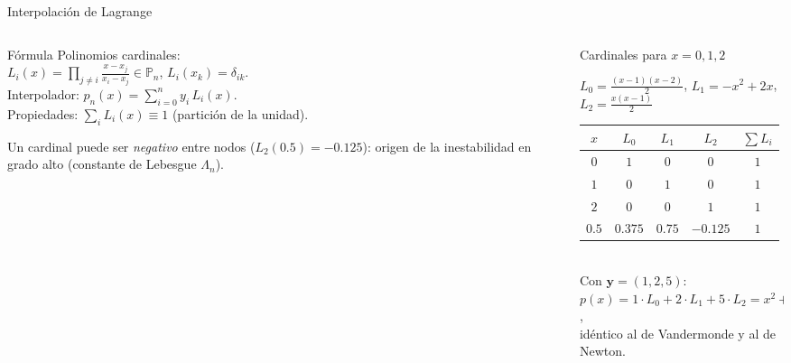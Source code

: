 \documentclass[aspectratio=169,10pt]{beamer}
\begin{document}
\begin{frame}{Interpolación de Lagrange}
\begin{columns}[T]
\begin{column}{0.44\textwidth}
\begin{cardidea}{Fórmula}{\faSuperscript}
{\footnotesize Polinomios cardinales:\\[0.2mm]
$L_i(x)=\displaystyle\prod_{j\neq i}\frac{x-x_j}{x_i-x_j}\in\mathbb P_n$, \; $L_i(x_k)=\delta_{ik}$.\\[1.2mm]
Interpolador: $p_n(x)=\displaystyle\sum_{i=0}^n y_i\,L_i(x)$.\\[1.2mm]
Propiedades: $\sum_i L_i(x)\equiv1$ (partición de la unidad).}
\end{cardidea}
\vspace{1mm}
\begin{cardnota}[\faExclamationTriangle]
{\footnotesize Un cardinal puede ser \emph{negativo} entre nodos ($L_2(0.5)=-0.125$): origen de la inestabilidad en grado alto (constante de Lebesgue $\Lambda_n$).}
\end{cardnota}
\end{column}
\begin{column}{0.54\textwidth}
\begin{cardgear}{Cardinales para $x=0,1,2$}{\faTable}
{\footnotesize $L_0=\tfrac{(x-1)(x-2)}{2}$, \; $L_1=-x^2+2x$, \; $L_2=\tfrac{x(x-1)}{2}$\\[1.0mm]
\centering
\renewcommand{\arraystretch}{1.12}\setlength{\tabcolsep}{6pt}
\begin{tabular}{c|cccc}
$x$ & $L_0$ & $L_1$ & $L_2$ & $\sum L_i$\\\hline
$0$&$1$&$0$&$0$&$1$\\
$1$&$0$&$1$&$0$&$1$\\
$2$&$0$&$0$&$1$&$1$\\
$0.5$&$0.375$&$0.75$&$-0.125$&$1$\\
\end{tabular}}\\[1.2mm]
{\footnotesize Con $\mathbf y=(1,2,5)$:\\[0.2mm]
$p(x)=1\cdot L_0+2\cdot L_1+5\cdot L_2=x^2+1$,\\[0.2mm]
idéntico al de Vandermonde y al de Newton.}
\end{cardgear}
\end{column}
\end{columns}
\end{frame}
\end{document}
